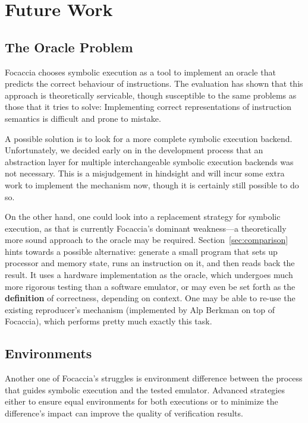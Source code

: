\chapter{Future Work}\label{chapter:future_work}

\section{The Oracle Problem}

Focaccia chooses symbolic execution as a tool to implement an oracle that predicts the correct behaviour of
instructions. The evaluation has shown that this approach is theoretically servicable, though susceptible to the same
problems as those that it tries to solve: Implementing correct representations of instruction semantics is difficult and
prone to mistake.

A possible solution is to look for a more complete symbolic execution backend. Unfortunately, we decided early on in the
development process that an abstraction layer for multiple interchangeable symbolic execution backends was not
necessary. This is a misjudgement in hindsight and will incur some extra work to implement the mechanism now, though it
is certainly still possible to do so.

On the other hand, one could look into a replacement strategy for symbolic execution, as that is currently Focaccia's
dominant weakness---a theoretically more sound approach to the oracle may be required. Section~\ref{sec:comparison}
hints towards a possible alternative: generate a small program that sets up processor and memory state, runs an
instruction on it, and then reads back the result. It uses a hardware implementation as the oracle, which undergoes much
more rigorous testing than a software emulator, or may even be set forth as the \textbf{definition} of correctness,
depending on context. One may be able to re-use the existing reproducer's mechanism (implemented by Alp Berkman on top
of Focaccia), which performs pretty much exactly this task.

\section{Environments}

Another one of Focaccia's struggles is environment difference between the process that guides symbolic execution and the
tested emulator. Advanced strategies either to ensure equal environments for both executions or to minimize the
difference's impact can improve the quality of verification results.

